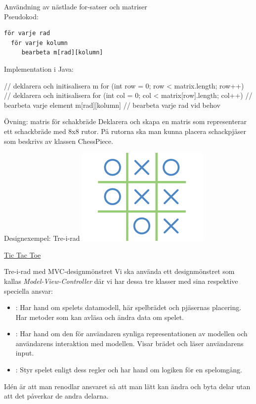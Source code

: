 \documentclass{lecturenotes}
\begin{document}
\begin{Slide}{Användning av nästlade for-satser och matriser}
\\ \vspace{1em}
Pseudokod:
\begin{verbatim}
för varje rad
  för varje kolumn
     bearbeta m[rad][kolumn]
\end{verbatim}
Implementation i Java:
\begin{Code}
        // deklarera och initisalisera m
        for (int row = 0; row < matrix.length; row++) {
            // deklarera och initisalisera
            for (int col = 0; col < matrix[row].length; col++) {
                 // bearbeta varje element m[rad][kolumn]
            }
           // bearbeta varje rad vid behov
        }
\end{Code}
\end{Slide}

\begin{Slide}{Övning: matris för schakbräde}
Deklarera och skapa en matris som representerar ett schackbräde med 8x8 rutor. På rutorna ska man kunna placera schackpjäser som beskrivs av klassen ChessPiece.
\end{Slide}

\begin{Slide}{Designexempel: Tre-i-rad}
\includegraphics{img/tictactoe}

\href{https://en.wikipedia.org/wiki/Tic-tac-toe}{Tic Tac Toe}
\end{Slide}

\begin{Slide}{Tre-i-rad med MVC-designmönstret}
Vi ska använda ett designmönstret som kallas \textit{Model-View-Controller} där vi har dessa tre klasser med sina respektive speciella ansvar:
\begin{itemize}
\item {}: Har hand om spelets datamodell, här spelbrädet och pjäsernas placering. Har metoder som kan avläsa och ändra data om spelet.
\item {}: Har hand om den för användaren synliga representationen av modellen och användarens interaktion med modellen. Visar brädet och läser användarens input.
\item {}: Styr spelet enligt dess regler och har hand om logiken för en spelomgång.
\end{itemize}
Idén är att man renodlar ansvaret så att man lätt kan ändra och byta delar utan att det påverkar de andra delarna. 
\end{Slide}
\end{document}
